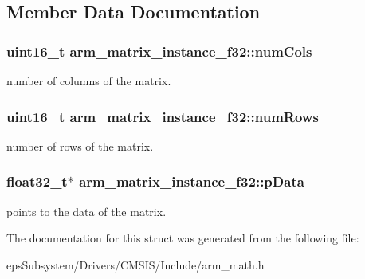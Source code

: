 \subsection{Member Data Documentation}
\hypertarget{structarm__matrix__instance__f32_acdd1fb73734df68b89565c54f1dd8ae2}{
\subsubsection[{num\-Cols}]{\setlength{\rightskip}{0pt plus 5cm}uint16\-\_\-t arm\-\_\-matrix\-\_\-instance\-\_\-f32\-::num\-Cols}}\label{structarm__matrix__instance__f32_acdd1fb73734df68b89565c54f1dd8ae2}
number of columns of the matrix. \hypertarget{structarm__matrix__instance__f32_a23f4e34d70a82c9cad7612add5640b7b}{
\subsubsection[{num\-Rows}]{\setlength{\rightskip}{0pt plus 5cm}uint16\-\_\-t arm\-\_\-matrix\-\_\-instance\-\_\-f32\-::num\-Rows}}\label{structarm__matrix__instance__f32_a23f4e34d70a82c9cad7612add5640b7b}
number of rows of the matrix. \hypertarget{structarm__matrix__instance__f32_af3917c032600a9dfd5ed4a96f074910a}{
\subsubsection[{p\-Data}]{\setlength{\rightskip}{0pt plus 5cm}float32\-\_\-t$\ast$ arm\-\_\-matrix\-\_\-instance\-\_\-f32\-::p\-Data}}\label{structarm__matrix__instance__f32_af3917c032600a9dfd5ed4a96f074910a}
points to the data of the matrix. 

The documentation for this struct was generated from the following file\-:\begin{DoxyCompactItemize}
\item 
eps\-Subsystem/\-Drivers/\-C\-M\-S\-I\-S/\-Include/arm\-\_\-math.\-h\end{DoxyCompactItemize}

